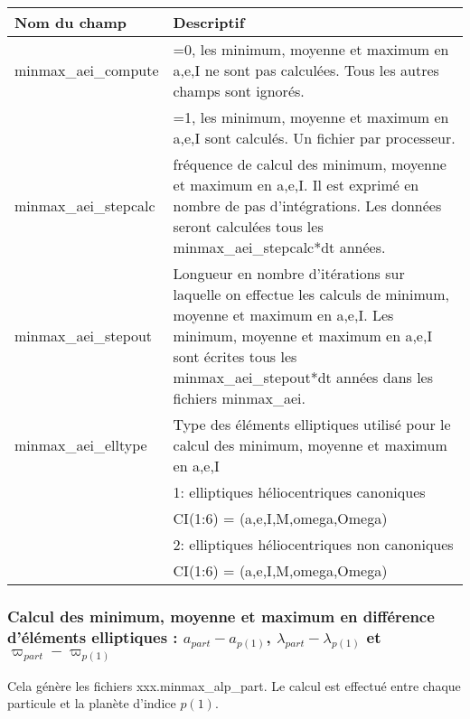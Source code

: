 \documentclass[11pt]{article}
\begin{document}
\begin{tabularx}{\textwidth}{|l|X|}
\hline
Nom du champ& Descriptif \\ \hline \hline
minmax\_aei\_compute &  =0, les minimum, moyenne et maximum en a,e,I ne sont pas calcul\'ees. Tous les autres champs sont ignor\'es.\\
&=1, les minimum, moyenne et maximum en a,e,I sont calcul\'es. Un fichier par processeur.\\ \hline

minmax\_aei\_stepcalc  & fr\'equence de calcul des minimum, moyenne et maximum en a,e,I. Il est exprim\'e en nombre de pas d'int\'egrations. Les donn\'ees seront calcul\'ees tous les minmax\_aei\_stepcalc*dt ann\'ees. \\ \hline

minmax\_aei\_stepout  & Longueur en nombre d'it\'erations sur laquelle on effectue les calculs de minimum, moyenne et maximum en a,e,I. Les minimum, moyenne et maximum en a,e,I sont \'ecrites tous les minmax\_aei\_stepout*dt ann\'ees dans les fichiers minmax\_aei.\\ \hline

minmax\_aei\_elltype  & Type des \'el\'ements elliptiques utilis\'e pour le calcul des  minimum, moyenne et maximum en a,e,I\\ 
&1:  elliptiques h\'eliocentriques canoniques\\
&	     CI(1:6) = (a,e,I,M,omega,Omega)\\
&2:  elliptiques h\'eliocentriques non canoniques\\
&	     CI(1:6) = (a,e,I,M,omega,Omega)\\ \hline

 \end{tabularx}

\vspace{0.5cm}
\subsubsection*{Calcul des minimum, moyenne et maximum en diff\'erence d'\'el\'ements elliptiques : $a_{part}-a_{p(1)}$, $\lambda_{part}-\lambda_{p(1)}$ et $\varpi_{part}-\varpi_{p(1)}$}
Cela g\'en\`ere les fichiers xxx.minmax\_alp\_part. Le calcul est effectu\'e entre chaque particule et la plan\`ete d'indice $p(1)$.
\end{document}
